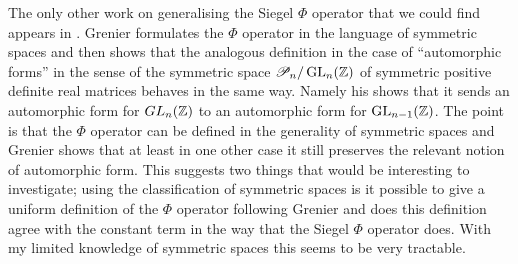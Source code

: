The only other work on generalising the Siegel \(\Phi\) operator that we could find appears in \cite{grenierAnalogueSiegelsFOperator1992}. 
Grenier formulates the \(\Phi\) operator in the language of symmetric spaces \cite[Ch. 2]{terrasHarmonicAnalysisSymmetric2016} and then shows that the analogous definition in the case of ``automorphic forms'' in the sense of the symmetric space \(\mathscr{P}_n/\GL_n(\Z)\) of symmetric positive definite real matrices \cite[1.5.1]{terrasHarmonicAnalysisSymmetric2016} behaves in the same way. Namely his \cite[Thm. 2]{grenierAnalogueSiegelsFOperator1992} shows that it sends an automorphic form for \(
GL_n(\Z)\) to an automorphic form for \(\GL_{n-1}(\Z)\). The point is that the \(\Phi\) operator can be defined in the generality of symmetric spaces and Grenier shows that at least in one other case it still preserves the relevant notion of automorphic form. This suggests two things that would be interesting to investigate; using the classification of symmetric spaces is it possible to give a uniform definition of the \(\Phi\) operator following Grenier and does this definition agree with the constant term in the way that the Siegel \(\Phi\) operator does. With my limited knowledge of symmetric spaces this seems to be very tractable.

